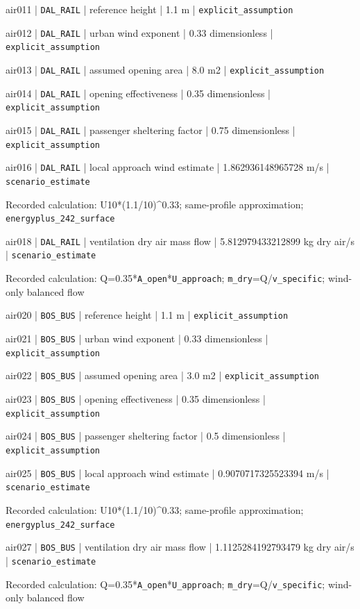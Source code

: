 air011 | \nolinkurl{DAL_RAIL} | reference height | 1.1 m | \nolinkurl{explicit_assumption}

air012 | \nolinkurl{DAL_RAIL} | urban wind exponent | 0.33 dimensionless | \nolinkurl{explicit_assumption}

air013 | \nolinkurl{DAL_RAIL} | assumed opening area | 8.0 m2 | \nolinkurl{explicit_assumption}

air014 | \nolinkurl{DAL_RAIL} | opening effectiveness | 0.35 dimensionless | \nolinkurl{explicit_assumption}

air015 | \nolinkurl{DAL_RAIL} | passenger sheltering factor | 0.75 dimensionless | \nolinkurl{explicit_assumption}

air016 | \nolinkurl{DAL_RAIL} | local approach wind estimate | 1.862936148965728 m/s | \nolinkurl{scenario_estimate}

Recorded calculation: U10*(1.1/10)\textasciicircum{}0.33; same-profile approximation; \nolinkurl{energyplus_242_surface}

air018 | \nolinkurl{DAL_RAIL} | ventilation dry air mass flow | 5.812979433212899 kg dry air/s | \nolinkurl{scenario_estimate}

Recorded calculation: Q=0.35*\nolinkurl{A_open}*\nolinkurl{U_approach}; \nolinkurl{m_dry}=Q/\nolinkurl{v_specific}; wind-only balanced flow

air020 | \nolinkurl{BOS_BUS} | reference height | 1.1 m | \nolinkurl{explicit_assumption}

air021 | \nolinkurl{BOS_BUS} | urban wind exponent | 0.33 dimensionless | \nolinkurl{explicit_assumption}

air022 | \nolinkurl{BOS_BUS} | assumed opening area | 3.0 m2 | \nolinkurl{explicit_assumption}

air023 | \nolinkurl{BOS_BUS} | opening effectiveness | 0.35 dimensionless | \nolinkurl{explicit_assumption}

air024 | \nolinkurl{BOS_BUS} | passenger sheltering factor | 0.5 dimensionless | \nolinkurl{explicit_assumption}

air025 | \nolinkurl{BOS_BUS} | local approach wind estimate | 0.9070717325523394 m/s | \nolinkurl{scenario_estimate}

Recorded calculation: U10*(1.1/10)\textasciicircum{}0.33; same-profile approximation; \nolinkurl{energyplus_242_surface}

air027 | \nolinkurl{BOS_BUS} | ventilation dry air mass flow | 1.1125284192793479 kg dry air/s | \nolinkurl{scenario_estimate}

Recorded calculation: Q=0.35*\nolinkurl{A_open}*\nolinkurl{U_approach}; \nolinkurl{m_dry}=Q/\nolinkurl{v_specific}; wind-only balanced flow


